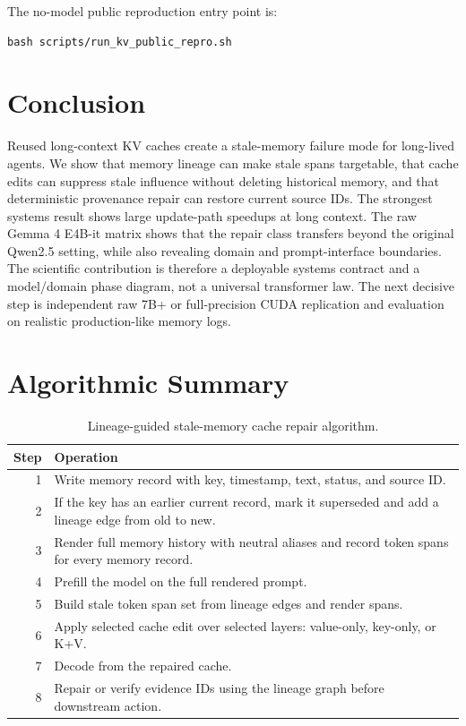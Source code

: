 \documentclass[11pt]{article}
\newcommand{\gemma}{Gemma 4 E4B-it}
\begin{document}
The no-model public reproduction entry point is:
\begin{verbatim}
bash scripts/run_kv_public_repro.sh
\end{verbatim}

\section{Conclusion}

Reused long-context KV caches create a stale-memory failure mode for long-lived
agents. We show that memory lineage can make stale spans targetable, that
cache edits can suppress stale influence without deleting historical memory,
and that deterministic provenance repair can restore current source IDs. The
strongest systems result shows large update-path speedups at long context. The
raw \gemma{} matrix shows that the repair class transfers beyond the original
Qwen2.5 setting, while also revealing domain and prompt-interface boundaries.
The scientific contribution is therefore a deployable systems contract and a
model/domain phase diagram, not a universal transformer law. The next decisive
step is independent raw 7B+ or full-precision CUDA replication and evaluation
on realistic production-like memory logs.

\appendix

\section{Algorithmic Summary}

\begin{table}[H]
\centering
\small
\begin{tabularx}{\linewidth}{rX}
\toprule
\textbf{Step} & \textbf{Operation} \\
\midrule
1 & Write memory record with key, timestamp, text, status, and source ID. \\
2 & If the key has an earlier current record, mark it superseded and add a lineage edge from old to new. \\
3 & Render full memory history with neutral aliases and record token spans for every memory record. \\
4 & Prefill the model on the full rendered prompt. \\
5 & Build stale token span set from lineage edges and render spans. \\
6 & Apply selected cache edit over selected layers: value-only, key-only, or K+V. \\
7 & Decode from the repaired cache. \\
8 & Repair or verify evidence IDs using the lineage graph before downstream action. \\
\bottomrule
\end{tabularx}
\caption{Lineage-guided stale-memory cache repair algorithm.}
\label{tab:algorithm}
\end{table}
\end{document}
